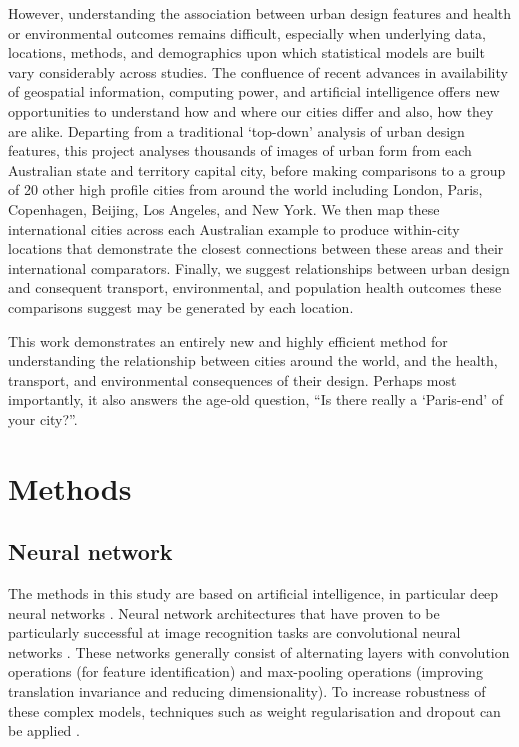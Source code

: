 \documentclass[final,3p,times,authoryear]{elsarticle}
\begin{document}
However, understanding the association between urban design features and health or environmental outcomes remains difficult, especially when underlying data, locations, methods, and demographics upon which statistical models are built vary considerably across studies. The confluence of recent advances in availability of geospatial information, computing power, and artificial intelligence offers new opportunities to understand how and where our cities differ and also, how they are alike. Departing from a traditional `top-down' analysis of urban design features, this project analyses thousands of images of urban form from each Australian state and territory capital city, before making comparisons to a group of 20 other high profile cities from around the world including London, Paris, Copenhagen, Beijing, Los Angeles, and New York. We then map these international cities across each Australian example to produce within-city locations that demonstrate the closest connections between these areas and their international comparators. Finally, we suggest relationships between urban design and consequent transport, environmental, and population health outcomes these comparisons suggest may be generated by each location.

This work demonstrates an entirely new and highly efficient method for understanding the relationship between cities around the world, and the health, transport, and environmental consequences of their design. Perhaps most importantly, it also answers the age-old question, ``Is there really a `Paris-end' of your city?''.


\section{Methods}\label{sec:methods}

\subsection{Neural network}\label{sec:methods1}














The methods in this study are based on artificial intelligence, in particular deep neural networks \citep{Bishop1995,Samarasinghe2016,Graupe2013}. Neural network architectures that have proven to be particularly successful at image recognition tasks are convolutional neural networks \citep{Schmidhuber2015}. These networks generally consist of alternating layers with convolution operations (for feature identification) and max-pooling operations (improving translation invariance and reducing dimensionality). To increase robustness of these complex models, techniques such as weight regularisation and dropout can be applied \citep{Srivastava2014}.
\end{document}

